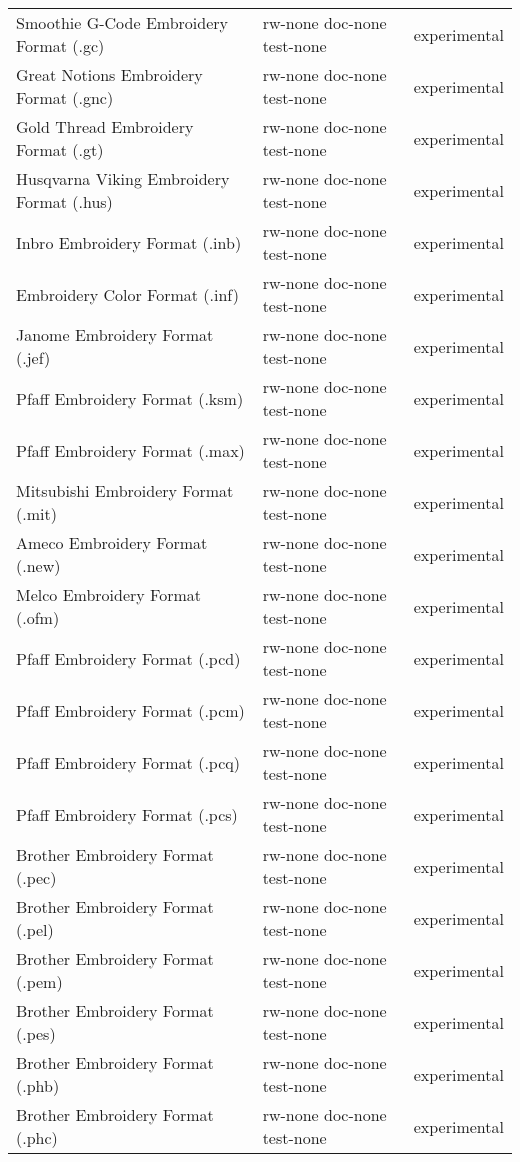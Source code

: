 \begin{longtable}{l l l}
Smoothie G-Code Embroidery Format (.gc) & rw-none doc-none test-none & experimental \\
Great Notions Embroidery Format (.gnc) & rw-none doc-none test-none & experimental \\
Gold Thread Embroidery Format (.gt) & rw-none doc-none test-none & experimental \\
Husqvarna Viking Embroidery Format (.hus) & rw-none doc-none test-none & experimental \\
Inbro Embroidery Format (.inb) & rw-none doc-none test-none & experimental \\
Embroidery Color Format (.inf) & rw-none doc-none test-none & experimental \\
Janome Embroidery Format (.jef) & rw-none doc-none test-none & experimental \\
Pfaff Embroidery Format (.ksm) & rw-none doc-none test-none & experimental \\
Pfaff Embroidery Format (.max) & rw-none doc-none test-none & experimental \\
Mitsubishi Embroidery Format (.mit) & rw-none doc-none test-none & experimental \\
Ameco Embroidery Format (.new) & rw-none doc-none test-none & experimental \\
Melco Embroidery Format (.ofm) & rw-none doc-none test-none & experimental \\
Pfaff Embroidery Format (.pcd) & rw-none doc-none test-none & experimental \\
Pfaff Embroidery Format (.pcm) & rw-none doc-none test-none & experimental \\
Pfaff Embroidery Format (.pcq) & rw-none doc-none test-none & experimental \\
Pfaff Embroidery Format (.pcs) & rw-none doc-none test-none & experimental \\
Brother Embroidery Format (.pec) & rw-none doc-none test-none & experimental \\
Brother Embroidery Format (.pel) & rw-none doc-none test-none & experimental \\
Brother Embroidery Format (.pem) & rw-none doc-none test-none & experimental \\
Brother Embroidery Format (.pes) & rw-none doc-none test-none & experimental \\
Brother Embroidery Format (.phb) & rw-none doc-none test-none & experimental \\
Brother Embroidery Format (.phc) & rw-none doc-none test-none & experimental \\

\end{longtable}
